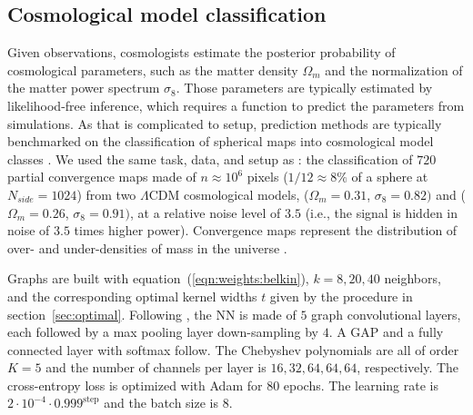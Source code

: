 \documentclass{article} %
\newcommand{\secref}[1]{section~\ref{sec:#1}}
\newcommand{\eqnref}[1]{equation~(\ref{eqn:#1})}
\begin{document}

\subsection{Cosmological model classification} \label{sec:exp:cosmo}

Given observations, cosmologists estimate the posterior probability of cosmological parameters, such as the matter density $\Omega_m$ and the normalization of the matter power spectrum $\sigma_8$.
Those parameters are typically estimated by likelihood-free inference, which requires a function to predict the parameters from simulations.
As that is complicated to setup, prediction methods are typically benchmarked on the classification of spherical maps into cosmological model classes \citep{schmelze2017cosmologicalmodel}.
We used the same task, data, and setup as \citet{perraudin2019deepspherecosmo}: the classification of $720$ partial convergence maps made of $n \approx 10^6$ pixels ($1/12 \approx 8\%$ of a sphere at $N_{side} = 1024$) from two $\Lambda$CDM cosmological models, ($\Omega_m = 0.31$, $\sigma_8 = 0.82)$ and ($\Omega_m = 0.26$, $\sigma_8 = 0.91)$, at a relative noise level of $3.5$ (i.e., the signal is hidden in noise of $3.5$ times higher power).
Convergence maps represent the distribution of over- and under-densities of mass in the universe \citep[see][for a review of gravitational lensing]{bartelman2010gravitationallensing}.

Graphs are built with \eqnref{weights:belkin}, $k = 8, 20, 40$ neighbors, and the corresponding optimal kernel widths $t$ given by the procedure in \secref{optimal}.
Following \citet{perraudin2019deepspherecosmo}, the NN is made of $5$ graph convolutional layers, each followed by a max pooling layer down-sampling by $4$.
A GAP and a fully connected layer with softmax follow.
The Chebyshev polynomials are all of order $K=5$ and the number of channels per layer is $16, 32, 64, 64, 64$, respectively.
The cross-entropy loss is optimized with Adam for 80 epochs.
The learning rate is $2 \cdot 10^{-4} \cdot 0.999^{\textrm{step}}$ and the batch size is 8.
\end{document}
